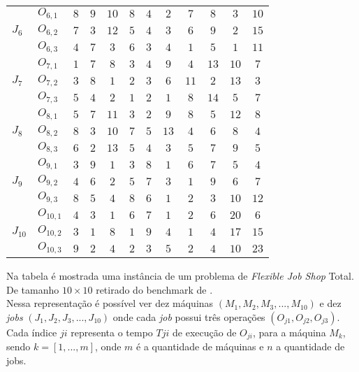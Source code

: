\begin{table}[htb]
\begin{tabular}[t]{llcccccccccc}
\multirow{3}{*}{$J_6$}&$O_{6,1}$ & $8$ & $9$ & $10$ & $8$ & $4$ & $2$ & $7$ & $8$ & $3$ & $10$\\
&$O_{6,2}$ & $7$ & $3$ & $12$ & $5$ & $4$ & $3$ & $6$ & $9$ & $2$ & $15$\\
&$O_{6,3}$ & $4$ & $7$ & $3$ & $6$ & $3$ & $4$ & $1$ & $5$ & $1$ & $11$\\
\multirow{3}{*}{$J_7$}&$O_{7,1}$ & $1$ & $7$ & $8$ & $3$ & $4$ & $9$ & $4$ & $13$ & $10$ & $7$\\
&$O_{7,2}$ & $3$ & $8$ & $1$ & $2$ & $3$ & $6$ & $11$ & $2$ & $13$ & $3$\\
&$O_{7,3}$ & $5$ & $4$ & $2$ & $1$ & $2$ & $1$ & $8$ & $14$ & $5$ & $7$\\
\multirow{3}{*}{$J_8$}&$O_{8,1}$ & $5$ & $7$ & $11$ & $3$ & $2$ & $9$ & $8$ & $5$ & $12$ & $8$\\
&$O_{8,2}$ & $8$ & $3$ & $10$ & $7$ & $5$ & $13$ & $4$ & $6$ & $8$ & $4$\\
&$O_{8,3}$ & $6$ & $2$ & $13$ & $5$ & $4$ & $3$ & $5$ & $7$ & $9$ & $5$\\
\multirow{3}{*}{$J_9$}&$O_{9,1}$ & $3$ & $9$ & $1$ & $3$ & $8$ & $1$ & $6$ & $7$ & $5$ & $4$\\
&$O_{9,2}$ & $4$ & $6$ & $2$ & $5$ & $7$ & $3$ & $1$ & $9$ & $6$ & $7$\\
&$O_{9,3}$ & $8$ & $5$ & $4$ & $8$ & $6$ & $1$ & $2$ & $3$ & $10$ & $12$\\
\multirow{3}{*}{$J_{10}$}&$O_{10,1}$ & $4$ & $3$ & $1$ & $6$ & $7$ & $1$ & $2$ & $6$ & $20$ & $6$\\
&$O_{10,2}$ & $3$ & $1$ & $8$ & $1$ & $9$ & $4$ & $1$ & $4$ & $17$ & $15$\\
&$O_{10,3}$ & $9$ & $2$ & $4$ & $2$ & $3$ & $5$ & $2$ & $4$ & $10$ & $23$\\
\hline
    \end{tabular}
\end{table}
Na tabela é mostrada uma instância de um problema de \textit{Flexible Job Shop} Total. De tamanho $10\times10$ retirado do benchmark de \cite{Kacem2002}.\\
%
\indent Nessa representação é possível ver dez máquinas $(M_1, M_2, M_3, ..., M_{10})$ e dez \textit{jobs} $(J_1, J_2, J_3, ..., J_{10})$ onde cada \textit{job} possui três operações $(O_{j1}, O_{j2}, O_{j3})$.\\
%
Cada índice $ji$ representa o tempo $T{ji}$ de execução de $O_{ji}$, para a máquina $M_k$, 
sendo $k=[1, ..., m]$, onde $m$ é a quantidade de máquinas e $n$ a quantidade de jobs.\\

